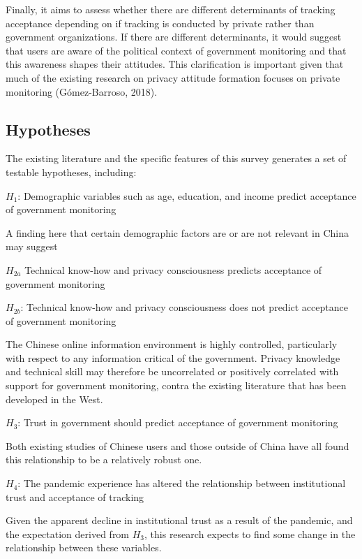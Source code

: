 \documentclass[
  letterpaper,
  DIV=11,
  numbers=noendperiod]{scrartcl}
\begin{document}
Finally, it aims to assess whether there are different determinants of
tracking acceptance depending on if tracking is conducted by private
rather than government organizations. If there are different
determinants, it would suggest that users are aware of the political
context of government monitoring and that this awareness shapes their
attitudes. This clarification is important given that much of the
existing research on privacy attitude formation focuses on private
monitoring (Gómez-Barroso, 2018).

\subsection{Hypotheses}\label{hypotheses}

The existing literature and the specific features of this survey
generates a set of testable hypotheses, including:

\(H_1\): Demographic variables such as age, education, and income
predict acceptance of government monitoring

A finding here that certain demographic factors are or are not relevant
in China may suggest

\(H_{2a}\) Technical know-how and privacy consciousness predicts
acceptance of government monitoring

\(H_{2b}\): Technical know-how and privacy consciousness does not
predict acceptance of government monitoring

The Chinese online information environment is highly controlled,
particularly with respect to any information critical of the government.
Privacy knowledge and technical skill may therefore be uncorrelated or
positively correlated with support for government monitoring, contra the
existing literature that has been developed in the West.

\(H_3\): Trust in government should predict acceptance of government
monitoring

Both existing studies of Chinese users and those outside of China have
all found this relationship to be a relatively robust one.

\(H_4\): The pandemic experience has altered the relationship between
institutional trust and acceptance of tracking

Given the apparent decline in institutional trust as a result of the
pandemic, and the expectation derived from \(H_3\), this research
expects to find some change in the relationship between these variables.
\end{document}
